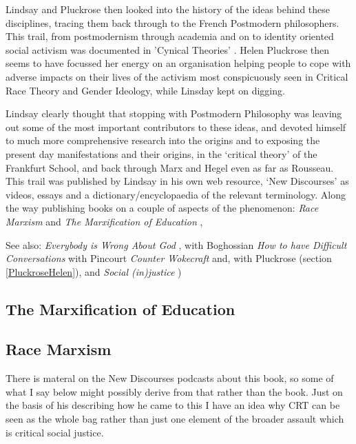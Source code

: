 \documentclass[10pt,titlepage]{book}
\begin{document}
Lindsay and Pluckrose then looked into the history of the ideas behind these disciplines, tracing them back through to the French Postmodern philosophers.
This trail, from postmodernism through academia and on to identity oriented social activism was documented in 'Cynical Theories' \cite{pluckrose-cynical}.
Helen Pluckrose then seems to have focussed her energy on an organisation helping people to cope with adverse impacts on their lives of the activism most conspicuously seen in Critical Race Theory and Gender Ideology, while Linsday kept on digging.

Lindsay clearly thought that stopping with Postmodern Philosophy was leaving out some of the most important contributors to these ideas, and devoted himself to much more comprehensive research into the origins and to exposing the present day manifestations and their origins, in the `critical theory' of the Frankfurt School, and back through Marx and Hegel even as far as Rousseau.
This trail was published by Lindsay in his own web resource, `New Discourses' as videos, essays and a dictionary/encyclopaedia of the relevant terminology.
Along the way publishing books on a couple of aspects of the phenomenon: \emph{Race Marxism} \cite{lindsay-racemarx} and \emph{The Marxification of Education} \cite{lindsay-marxedu},

See also: \emph{Everybody is Wrong About God} \cite{lindsay-everybody},
with Boghossian \emph{How to have Difficult Conversations} \cite{boghossian-conversations}
with Pincourt \emph{Counter Wokecraft} \cite{pincourt-cw}
and, with Pluckrose (section \ref{PluckroseHelen}),
and \emph{Social (in)justice} \cite{pluckrose-socinj})

\subsection{The Marxification of Education \cite{lindsay-marxedu}}


\subsection{Race Marxism \cite{lindsay-racemarx}}

There is materal on the New Discourses podcasts \cite{lindsay-discourses} about this book, so some of what I say below might possibly derive from that rather than the book.
Just on the basis of his describing how he came to this I have an idea why CRT can be seen as the whole bag rather than just one element of the broader assault which is critical social justice.
\end{document}
